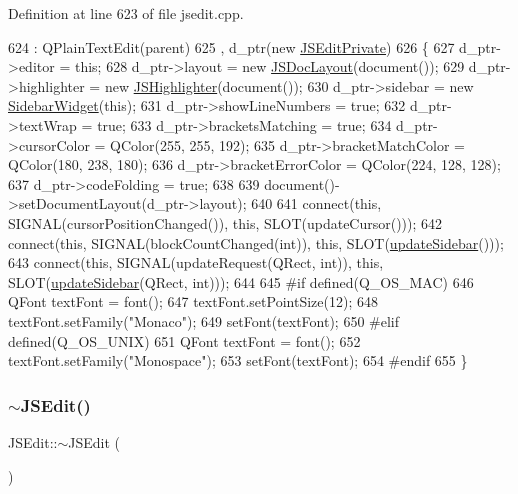 Definition at line 623 of file jsedit.\+cpp.


\begin{DoxyCode}
624     : QPlainTextEdit(parent)
625     , d\_ptr(\textcolor{keyword}{new} \hyperlink{class_j_s_edit_private}{JSEditPrivate})
626 \{
627     d\_ptr->editor = \textcolor{keyword}{this};
628     d\_ptr->layout = \textcolor{keyword}{new} \hyperlink{class_j_s_doc_layout}{JSDocLayout}(document());
629     d\_ptr->highlighter = \textcolor{keyword}{new} \hyperlink{class_j_s_highlighter}{JSHighlighter}(document());
630     d\_ptr->sidebar = \textcolor{keyword}{new} \hyperlink{class_sidebar_widget}{SidebarWidget}(\textcolor{keyword}{this});
631     d\_ptr->showLineNumbers = \textcolor{keyword}{true};
632     d\_ptr->textWrap = \textcolor{keyword}{true};
633     d\_ptr->bracketsMatching = \textcolor{keyword}{true};
634     d\_ptr->cursorColor = QColor(255, 255, 192);
635     d\_ptr->bracketMatchColor = QColor(180, 238, 180);
636     d\_ptr->bracketErrorColor = QColor(224, 128, 128);
637     d\_ptr->codeFolding = \textcolor{keyword}{true};
638 
639     document()->setDocumentLayout(d\_ptr->layout);
640 
641     connect(\textcolor{keyword}{this}, SIGNAL(cursorPositionChanged()), \textcolor{keyword}{this}, SLOT(updateCursor()));
642     connect(\textcolor{keyword}{this}, SIGNAL(blockCountChanged(\textcolor{keywordtype}{int})), \textcolor{keyword}{this}, SLOT(\hyperlink{class_j_s_edit_ac51a3a9f7b1e8c5bc98b345bfc3d3b53}{updateSidebar}()));
643     connect(\textcolor{keyword}{this}, SIGNAL(updateRequest(QRect, \textcolor{keywordtype}{int})), \textcolor{keyword}{this}, SLOT(\hyperlink{class_j_s_edit_ac51a3a9f7b1e8c5bc98b345bfc3d3b53}{updateSidebar}(QRect, \textcolor{keywordtype}{int})));
644 
645 \textcolor{preprocessor}{#if defined(Q\_OS\_MAC)}
646     QFont textFont = font();
647     textFont.setPointSize(12);
648     textFont.setFamily(\textcolor{stringliteral}{"Monaco"});
649     setFont(textFont);
650 \textcolor{preprocessor}{#elif defined(Q\_OS\_UNIX)}
651     QFont textFont = font();
652     textFont.setFamily(\textcolor{stringliteral}{"Monospace"});
653     setFont(textFont);
654 \textcolor{preprocessor}{#endif}
655 \}
\end{DoxyCode}
\mbox{\label{class_j_s_edit_a53e969b73a8472fd0f22b504ea68fb29}} 
\subsubsection{\texorpdfstring{$\sim$\+J\+S\+Edit()}{~JSEdit()}}
{\footnotesize\ttfamily J\+S\+Edit\+::$\sim$\+J\+S\+Edit (\begin{DoxyParamCaption}{ }\end{DoxyParamCaption})}



